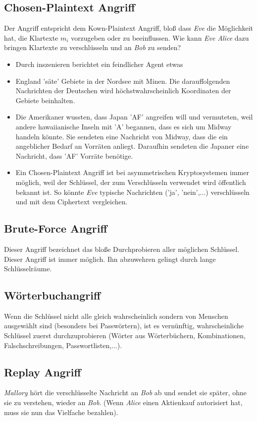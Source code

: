 \subsection{Chosen-Plaintext Angriff}
Der Angriff entspricht dem Kown-Plaintext Angriff, bloß dass \textit{Eve} die Möglichkeit hat, die Klartexte $m_i$ vorzugeben oder zu beeinflussen. Wie kann \textit{Eve} \textit{Alice} dazu bringen Klartexte zu verschlüsseln und an \textit{Bob} zu senden?
\begin{itemize}
	\item Durch inszenieren berichtet ein feindlicher Agent etwas
	\item England 'säte' Gebiete in der Nordsee mit Minen. Die darauffolgenden Nachrichten der Deutschen wird höchstwahrscheinlich Koordinaten der Gebiete beinhalten.
	\item Die Amerikaner wussten, dass Japan 'AF' angreifen will und vermuteten, weil andere hawaiianische Inseln mit 'A' begannen, dass es sich um Midway handeln könnte. Sie sendeten eine Nachricht von Midway, dass die ein angeblicher Bedarf an Vorräten anliegt. Daraufhin sendeten die Japaner eine Nachricht, dass 'AF' Vorräte benötige.
	\item Ein Chosen-Plaintext Angriff ist bei asymmetrischen Kryptosystemen immer möglich, weil der Schlüssel, der zum Verschlüsseln verwendet wird öffentlich bekannt ist. So könnte \textit{Eve} typische Nachrichten ('ja', 'nein',...) verschlüsseln und mit dem Ciphertext vergleichen.
\end{itemize}

\subsection{Brute-Force Angriff}
Dieser Angriff bezeichnet das bloße Durchprobieren aller möglichen Schlüssel. Dieser Angriff ist immer möglich. Ihn abzuwehren gelingt durch lange Schlüsselräume.

\subsection{Wörterbuchangriff}
Wenn die Schlüssel nicht alle gleich wahrscheinlich sondern von Menschen ausgewählt sind (besonders bei Passwörtern), ist es vernünftig, wahrscheinliche Schlüssel zuerst durchzuprobieren (Wörter aus Wörterbüchern, Kombinationen, Falschschreibungen, Passwortlisten,...).

\subsection{Replay Angriff}
\textit{Mallory} hört die verschlüsselte Nachricht an \textit{Bob} ab und sendet sie später, ohne sie zu verstehen, wieder an \textit{Bob}. (Wenn \textit{Alice} einen Aktienkauf autorisiert hat, muss sie nun das Vielfache bezahlen).

